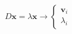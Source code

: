 \documentclass[preview]{standalone}
\begin{document}
\begin{align*}
D \bm x = \lambda \bm x \to \begin{cases} \bm v_i\\ \lambda_i \end{cases}
\end{align*}
\end{document}
